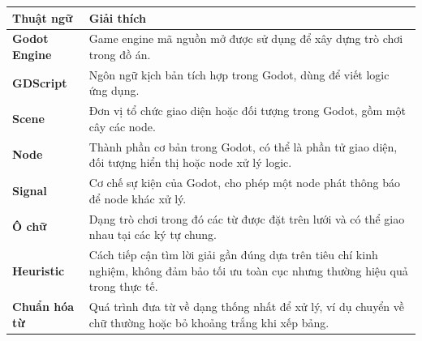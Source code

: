 \documentclass[../DoAn.tex]{subfiles}
\begin{document}
\begin{longtable}{l p{11cm}}
	\hline
   \textbf{Thuật ngữ}  & \textbf{Giải thích} \\ \hline 
	\textbf{Godot Engine} & Game engine mã nguồn mở được sử dụng để xây dựng trò chơi trong đồ án. \\
	\textbf{GDScript} & Ngôn ngữ kịch bản tích hợp trong Godot, dùng để viết logic ứng dụng. \\
	\textbf{Scene} & Đơn vị tổ chức giao diện hoặc đối tượng trong Godot, gồm một cây các node. \\
	\textbf{Node} & Thành phần cơ bản trong Godot, có thể là phần tử giao diện, đối tượng hiển thị hoặc node xử lý logic. \\
	\textbf{Signal} & Cơ chế sự kiện của Godot, cho phép một node phát thông báo để node khác xử lý. \\
	\textbf{Ô chữ} & Dạng trò chơi trong đó các từ được đặt trên lưới và có thể giao nhau tại các ký tự chung. \\
	\textbf{Heuristic} & Cách tiếp cận tìm lời giải gần đúng dựa trên tiêu chí kinh nghiệm, không đảm bảo tối ưu toàn cục nhưng thường hiệu quả trong thực tế. \\
	\textbf{Chuẩn hóa từ} & Quá trình đưa từ về dạng thống nhất để xử lý, ví dụ chuyển về chữ thường hoặc bỏ khoảng trắng khi xếp bảng. \\

    \hline
\end{longtable}
\end{document}

